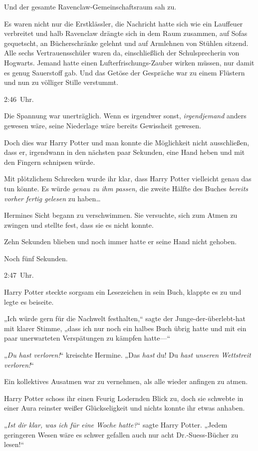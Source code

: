 {Und der gesamte Ravenclaw-Gemeinschaftsraum sah zu.

Es waren nicht nur die Erstklässler, die Nachricht hatte sich wie ein Lauffeuer verbreitet und halb Ravenclaw drängte sich in dem Raum zusammen, auf Sofas gequetscht, an Bücherschränke gelehnt und auf Armlehnen von Stühlen sitzend. Alle sechs Vertrauensschüler waren da, einschließlich der Schulsprecherin von Hogwarts. Jemand hatte einen Lufterfrischungs-Zauber wirken müssen, nur damit es genug Sauerstoff gab. Und das Getöse der Gespräche war zu einem Flüstern und nun zu völliger Stille verstummt.

2:46~Uhr.

Die Spannung war unerträglich. Wenn es irgendwer sonst, \emph{irgendjemand} anders gewesen wäre, seine Niederlage wäre bereits Gewissheit gewesen.

Doch dies war Harry Potter und man konnte die Möglichkeit nicht ausschließen, dass er, irgendwann in den nächsten paar Sekunden, eine Hand heben und mit den Fingern schnipsen würde.

Mit plötzlichem Schrecken wurde ihr klar, dass Harry Potter vielleicht genau das tun könnte. Es würde \emph{genau zu ihm passen,} die zweite Hälfte des Buches \emph{bereits vorher fertig gelesen} zu haben…

Hermines Sicht begann zu verschwimmen. Sie versuchte, sich zum Atmen zu zwingen und stellte fest, dass sie es nicht konnte.

Zehn Sekunden blieben und noch immer hatte er seine Hand nicht gehoben.

Noch fünf Sekunden.

2:47~Uhr.

Harry Potter steckte sorgsam ein Lesezeichen in sein Buch, klappte es zu und legte es beiseite.

„Ich würde gern für die Nachwelt festhalten,“ sagte der Junge-der-überlebt-hat mit klarer Stimme, „dass ich nur noch ein halbes Buch übrig hatte und mit ein paar unerwarteten Verspätungen zu kämpfen hatte—“

„\emph{Du hast verloren!}“ kreischte Hermine. „Das \emph{hast} du! Du \emph{hast unseren Wettstreit verloren!}“

Ein kollektives Ausatmen war zu vernehmen, als alle wieder anfingen zu atmen.

Harry Potter schoss ihr einen Feurig Lodernden Blick zu, doch sie schwebte in einer Aura reinster weißer Glückseligkeit und nichts konnte ihr etwas anhaben.

„\emph{Ist dir klar, was ich für eine Woche hatte?}“ sagte Harry Potter. „Jedem geringeren Wesen wäre es schwer gefallen auch nur acht Dr.-Suess-Bücher zu lesen!“

}
